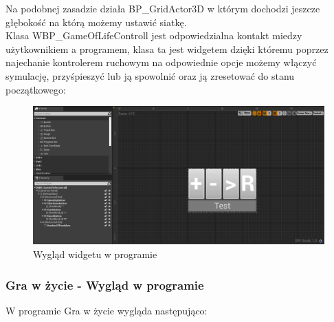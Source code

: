 \documentclass[a4paper,12pt,reqno]{article}
\begin{document}
Na podobnej zasadzie działa BP\_GridActor3D w którym dochodzi jeszcze głębokość na którą możemy ustawić siatkę.\\

Klasa WBP\_GameOfLifeControll jest odpowiedzialna kontakt miedzy użytkownikiem a programem, klasa ta jest widgetem dzięki któremu poprzez najechanie kontrolerem ruchowym na odpowiednie opcje możemy włączyć symulację, przyśpieszyć lub ją spowolnić oraz ją zresetować do stanu początkowego:

\begin{figure}[H]%
\centering
\includegraphics[width=0.7\columnwidth]{graphics/gameoflife/GameOfLifeControllInUE_1.png}
\caption{Wygląd widgetu w programie
\label{BPExample}}%
%
\qquad
\end{figure}  

\subsubsection{Gra w życie - Wygląd w programie}
W programie Gra w życie wygląda następująco:
\end{document}
